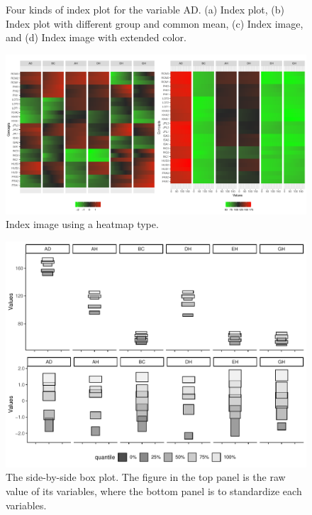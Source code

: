\documentclass[article]{jss}
\begin{document}
\begin{appendix}
\begin{figure}[t!]
\begin{tabular}{cc}
\end{tabular}
\caption{\label{fig:index_full} Four kinds of index plot for the variable AD.
(a) Index plot, (b) Index plot with different group and common mean, (c) Index image,
and (d) Index image with extended color.}
\end{figure}

 

\begin{figure}[t!]
    \centering 
    \includegraphics[width=1\textwidth]{pic/indexImage_2case}
    \caption{\label{fig:indexImage} Index image using a heatmap type.}
\end{figure}



\begin{figure}[t!]
\centering
\includegraphics[width=1\textwidth]{pic/box_centerRange_before}
\caption{\label{fig:box} The side-by-side box plot. The figure in the top panel is the raw value of its variables, where the bottom panel is to standardize each variables.}
\end{figure}




\end{appendix}
\end{document}
